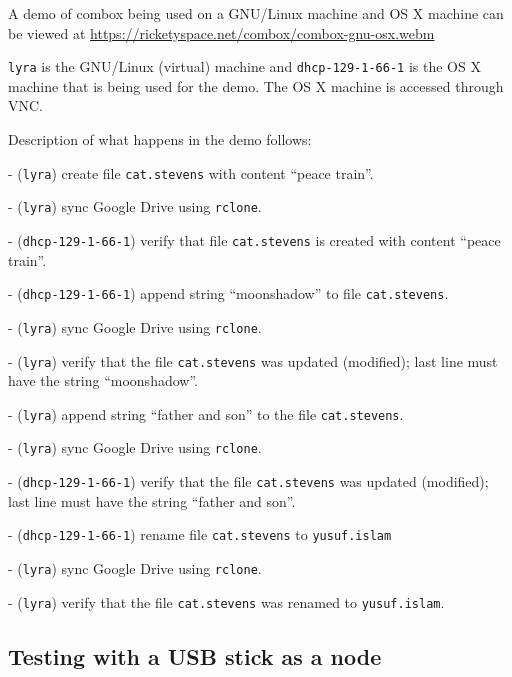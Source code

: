 A demo of combox being used on a GNU/Linux machine and OS X machine can
be viewed at \url{https://ricketyspace.net/combox/combox-gnu-osx.webm}

\verb+lyra+ is the GNU/Linux (virtual) machine and
\verb+dhcp-129-1-66-1+ is the OS X machine that is being used for the
demo. The OS X machine is accessed through VNC\cite{article:vnc}.

Description of what happens in the demo follows:

  - (\verb+lyra+) create file \verb+cat.stevens+ with content ``peace train''.

  - (\verb+lyra+) sync Google Drive using \verb+rclone+.

  - (\verb+dhcp-129-1-66-1+) verify that file \verb+cat.stevens+ is
  created with content ``peace train''.

  - (\verb+dhcp-129-1-66-1+) append string ``moonshadow'' to file
  \verb+cat.stevens+.

  - (\verb+lyra+) sync Google Drive using \verb+rclone+.

  - (\verb+lyra+) verify that the file \verb+cat.stevens+ was updated
  (modified); last line must have the string ``moonshadow''.

  - (\verb+lyra+) append string ``father and son'' to the file
  \verb+cat.stevens+.

  - (\verb+lyra+) sync Google Drive using \verb+rclone+.

  - (\verb+dhcp-129-1-66-1+) verify that the file \verb+cat.stevens+
  was updated (modified); last line must have the string ``father and
  son''.

  - (\verb+dhcp-129-1-66-1+) rename file \verb+cat.stevens+ to
  \verb+yusuf.islam+

  - (\verb+lyra+) sync Google Drive using \verb+rclone+.

  - (\verb+lyra+) verify that the file \verb+cat.stevens+ was renamed
  to \verb+yusuf.islam+.

\subsection{Testing with a USB stick as a node}

